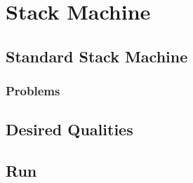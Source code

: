 \section{Stack Machine}
\label{sec:stack-machine}


\subsection{Standard Stack Machine}
\subsubsection{Problems}
\subsection{Desired Qualities}


\subsection{Run}

